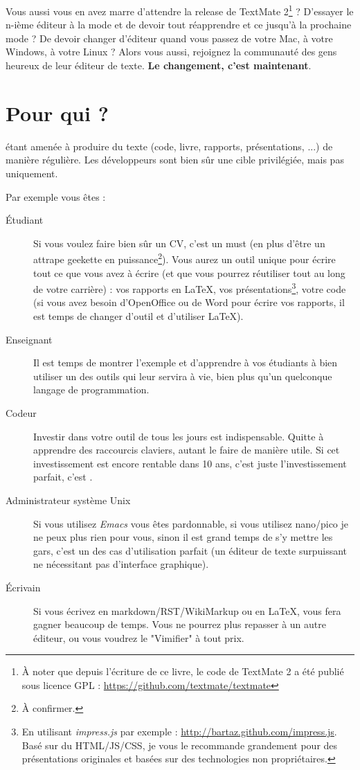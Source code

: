 Vous aussi vous en avez marre d'attendre la release de TextMate 2\footnote{À noter que depuis l'écriture de ce livre, le code de TextMate 2 a été publié sous licence GPL : \url{https://github.com/textmate/textmate}} ? D'essayer le n-ième éditeur à la mode et de devoir tout réapprendre et ce jusqu'à la prochaine mode ? De devoir changer d'éditeur quand vous passez de votre Mac, à votre Windows, à votre Linux ? Alors vous aussi, rejoignez la communauté des gens heureux de leur éditeur de texte. \textbf{Le changement, c'est maintenant}.

\section{Pour qui ?}

 étant amenée à produire du texte (code, livre, rapports, présentations, ...) de manière régulière. Les développeurs sont bien sûr une cible privilégiée, mais pas uniquement.

Par exemple vous êtes :
\begin{description}
    \item[Étudiant] Si vous voulez faire bien sûr un CV, c'est un must (en plus d'être un attrape geekette en puissance\footnote{À confirmer.}). Vous aurez un outil unique pour écrire tout ce que vous avez à écrire (et que vous pourrez réutiliser tout au long de votre carrière) : vos rapports en \LaTeX, vos présentations\footnote{En utilisant \emph{impress.js} par exemple : \url{http://bartaz.github.com/impress.js}. Basé sur du HTML/JS/CSS, je vous le recommande grandement pour des présentations originales et basées sur des technologies non propriétaires.}, votre code (si vous avez besoin d'OpenOffice ou de Word pour écrire vos rapports, il est temps de changer d'outil et d'utiliser \LaTeX).
    \item[Enseignant] Il est temps de montrer l'exemple et d'apprendre à vos étudiants à bien utiliser un des outils qui leur servira à vie, bien plus qu'un quelconque langage de programmation.
    \item[Codeur] Investir dans votre outil de tous les jours est indispensable. Quitte à apprendre des raccourcis claviers, autant le faire de manière utile. Si cet investissement est encore rentable dans 10 ans, c'est juste l'investissement parfait, c'est \vim.
    \item[Administrateur système Unix] Si vous utilisez \emph{Emacs} vous êtes pardonnable, si vous utilisez nano/pico je ne peux plus rien pour vous, sinon il est grand temps de s'y mettre les gars, c'est un des cas d'utilisation parfait (un éditeur de texte surpuissant ne nécessitant pas d'interface graphique).
    \item[Écrivain] Si vous écrivez en markdown/RST/WikiMarkup ou en \LaTeX, \vim vous fera gagner beaucoup de temps. Vous ne pourrez plus repasser à un autre éditeur, ou vous voudrez le "Vimifier" à tout prix.
\end{description}

